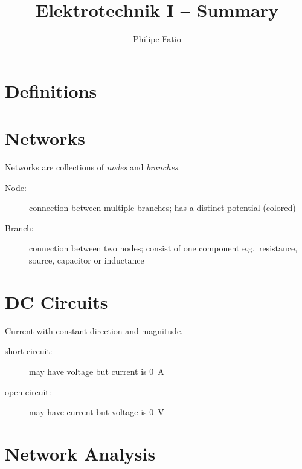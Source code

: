 \documentclass[9pt,fleqn,english,article]{memoir}
\title{Elektrotechnik I -- Summary}
\author{Philipe Fatio}
\newcommand{\circuit}[1]{
	
}
\newcommand{\circuitw}[2]{
	\resizebox{#2}{!} {
		\circuit{#1}
	}
}
\begin{document}
\begin{multicols*}{3}
	
	\section{Definitions} %
	
	\section{Networks} %
	
		Networks are collections of \emph{nodes} and \emph{branches}.
		
		\begin{description}
			\item[Node:] connection between multiple branches; has a distinct potential (colored)
			\item[Branch:] connection between two nodes; consist of one component e.g.~resistance, source, capacitor or inductance
		\end{description}
		
		\circuitw{network}{\columnwidth}
		

	\section{DC Circuits} %
		
		Current with constant direction and magnitude.
		
		\begin{description}
			\item[short circuit:] may have voltage but current is \SI{0}{A}
			\item[open circuit:] may have current but voltage is \SI{0}{V}
		\end{description}
		
		
		
	
	\section{Network Analysis} %
	

\end{multicols*}
\end{document}
